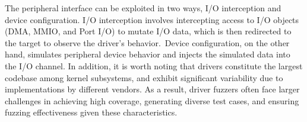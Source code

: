 The peripheral interface can be exploited in two ways, \ie I/O interception and device configuration. I/O interception involves intercepting access to I/O objects (\eg DMA, MMIO, and Port I/O) to mutate I/O data, which is then redirected to the target to observe the driver's behavior.~Device configuration, on the other hand, simulates peripheral device behavior and injects the simulated data into the I/O channel. In addition, it is worth noting that drivers constitute the largest codebase among kernel subsystems, and exhibit significant variability due to implementations by different vendors. As a result, driver fuzzers often face larger challenges in achieving high coverage, generating diverse test cases, and ensuring fuzzing effectiveness given these characteristics.

